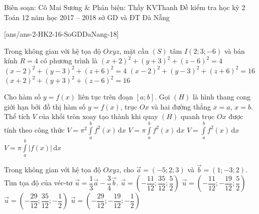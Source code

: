 
\begin{name}
{Biên soạn: Cô Mai Sương \& Phản biện: Thầy KVThanh}
{Đề kiểm tra học kỳ 2 Toán 12 năm học 2017 – 2018 sở GD và ĐT Đà Nẵng}
\end{name}
\setcounter{ex}{0}
[ans/ans-2-HK2-16-SoGDDaNang-18]
\begin{ex}%
Trong không gian với hệ tọa độ $Oxyz$, mặt cầu $(S)$ tâm $I(2;3;-6)$ và bán kính $R=4$ có phương trình là
\choice
{$(x+2)^2+(y+3)^2+(z-6)^2=4$}
{$(x-2)^2+(y-3)^2+(z+6)^2=4$}
{\True $(x-2)^2+(y-3)^2+(z+6)^2=16$}
{$(x+2)^2+(y+3)^2+(z-6)^2=16$}
\end{ex}

\begin{ex}%
Cho hàm số $y=f(x)$ liên tục trên đoạn $[a;b]$. Gọi $(H)$ là hình thang cong giới hạn bởi đồ thị hàm số $y=f(x)$, trục $Ox$ và hai đường thẳng $x=a$, $x=b$. Thể tích $V$ của khối tròn xoay tạo thành khi quay $(H)$ quanh trục $Ox$ được tính theo công thức
\choice
{$V=\pi^2 \displaystyle\int\limits_a^b f^2(x)\mathrm{\,d}x$}
{\True $V=\pi \displaystyle\int\limits_a^b f^2(x)\mathrm{\,d}x$}
{$V=\displaystyle\int\limits_a^b f^2(x)\mathrm{\,d}x$}
{$V=\pi \displaystyle\int\limits_a^b |f(x)|\mathrm{\,d}x$}
\end{ex}

\begin{ex}%
Trong không gian với hệ tọa độ $Oxyz$, cho $\overrightarrow{a}=(-5;2;3)$ và $\overrightarrow{b}=(1;-3;2)$. Tìm tọa độ của véc-tơ $\overrightarrow{u}=\dfrac{1}{3} \overrightarrow{a} -\dfrac{3}{4} \overrightarrow{b}.$	
\choice
{$\overrightarrow{u}=\left(-\dfrac{11}{12};\dfrac{35}{12};\dfrac{5}{2}\right)$}
{$\overrightarrow{u}=\left(-\dfrac{11}{12};-\dfrac{19}{12};\dfrac{5}{2}\right)$}
{\True $\overrightarrow{u}=\left(-\dfrac{29}{12};\dfrac{35}{12};-\dfrac{1}{2}\right)$}
{$\overrightarrow{u}=\left(-\dfrac{29}{12};-\dfrac{19}{12};-\dfrac{1}{2}\right)$}
\end{ex}


